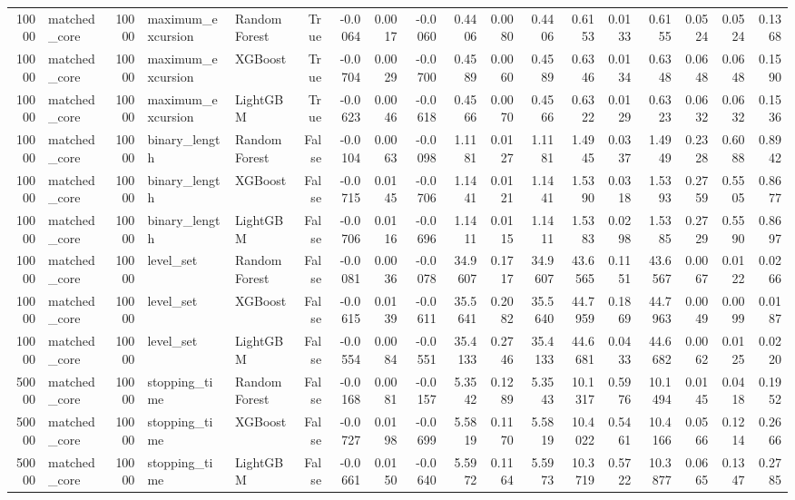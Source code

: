 \begin{table}
\begin{tabular}{rlrllrrrrrrrrrrrrr}
10000 & matched_core & 10000 & maximum_excursion & RandomForest & True & -0.0064 & 0.0017 & -0.0060 & 0.4406 & 0.0080 & 0.4406 & 0.6153 & 0.0133 & 0.6155 & 0.0524 & 0.0524 & 0.1368 \\
10000 & matched_core & 10000 & maximum_excursion & XGBoost & True & -0.0704 & 0.0029 & -0.0700 & 0.4589 & 0.0060 & 0.4589 & 0.6346 & 0.0134 & 0.6348 & 0.0648 & 0.0648 & 0.1590 \\
10000 & matched_core & 10000 & maximum_excursion & LightGBM & True & -0.0623 & 0.0046 & -0.0618 & 0.4566 & 0.0070 & 0.4566 & 0.6322 & 0.0129 & 0.6323 & 0.0632 & 0.0632 & 0.1536 \\
10000 & matched_core & 10000 & binary_length & RandomForest & False & -0.0104 & 0.0063 & -0.0098 & 1.1181 & 0.0127 & 1.1181 & 1.4945 & 0.0337 & 1.4949 & 0.2328 & 0.6088 & 0.8942 \\
10000 & matched_core & 10000 & binary_length & XGBoost & False & -0.0715 & 0.0145 & -0.0706 & 1.1441 & 0.0121 & 1.1441 & 1.5390 & 0.0318 & 1.5393 & 0.2759 & 0.5505 & 0.8677 \\
10000 & matched_core & 10000 & binary_length & LightGBM & False & -0.0706 & 0.0116 & -0.0696 & 1.1411 & 0.0115 & 1.1411 & 1.5383 & 0.0298 & 1.5385 & 0.2729 & 0.5590 & 0.8697 \\
10000 & matched_core & 10000 & level_set & RandomForest & False & -0.0081 & 0.0036 & -0.0078 & 34.9607 & 0.1717 & 34.9607 & 43.6565 & 0.1151 & 43.6567 & 0.0067 & 0.0122 & 0.0266 \\
10000 & matched_core & 10000 & level_set & XGBoost & False & -0.0615 & 0.0139 & -0.0611 & 35.5641 & 0.2082 & 35.5640 & 44.7959 & 0.1869 & 44.7963 & 0.0049 & 0.0099 & 0.0187 \\
10000 & matched_core & 10000 & level_set & LightGBM & False & -0.0554 & 0.0084 & -0.0551 & 35.4133 & 0.2746 & 35.4133 & 44.6681 & 0.0433 & 44.6682 & 0.0062 & 0.0125 & 0.0220 \\
50000 & matched_core & 10000 & stopping_time & RandomForest & False & -0.0168 & 0.0081 & -0.0157 & 5.3542 & 0.1289 & 5.3543 & 10.1317 & 0.5976 & 10.1494 & 0.0145 & 0.0418 & 0.1952 \\
50000 & matched_core & 10000 & stopping_time & XGBoost & False & -0.0727 & 0.0198 & -0.0699 & 5.5819 & 0.1170 & 5.5819 & 10.4022 & 0.5461 & 10.4166 & 0.0566 & 0.1214 & 0.2666 \\
50000 & matched_core & 10000 & stopping_time & LightGBM & False & -0.0661 & 0.0150 & -0.0640 & 5.5972 & 0.1164 & 5.5973 & 10.3719 & 0.5722 & 10.3877 & 0.0665 & 0.1347 & 0.2785 \\

\end{tabular}
\end{table}
